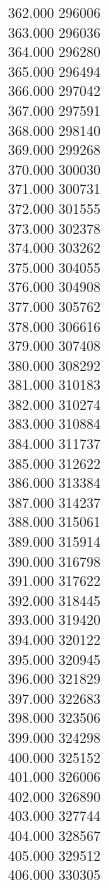 { 362.000	296006 \\
 363.000	296036 \\
 364.000	296280 \\
 365.000	296494 \\
 366.000	297042 \\
 367.000	297591 \\
 368.000	298140 \\
 369.000	299268 \\
 370.000	300030 \\
 371.000	300731 \\
 372.000	301555 \\
 373.000	302378 \\
 374.000	303262 \\
 375.000	304055 \\
 376.000	304908 \\
 377.000	305762 \\
 378.000	306616 \\
 379.000	307408 \\
 380.000	308292 \\
 381.000	310183 \\
 382.000	310274 \\
 383.000	310884 \\
 384.000	311737 \\
 385.000	312622 \\
 386.000	313384 \\
 387.000	314237 \\
 388.000	315061 \\
 389.000	315914 \\
 390.000	316798 \\
 391.000	317622 \\
 392.000	318445 \\
 393.000	319420 \\
 394.000	320122 \\
 395.000	320945 \\
 396.000	321829 \\
 397.000	322683 \\
 398.000	323506 \\
 399.000	324298 \\
 400.000	325152 \\
 401.000	326006 \\
 402.000	326890 \\
 403.000	327744 \\
 404.000	328567 \\
 405.000	329512 \\
 406.000	330305 \\
}
